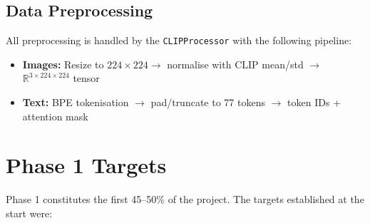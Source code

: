 \documentclass[12pt,a4paper]{article}
\begin{document}
\subsection{Data Preprocessing}

All preprocessing is handled by the \texttt{CLIPProcessor} with the following pipeline:

\begin{itemize}
  \item \textbf{Images:} Resize to $224 \times 224 \rightarrow$ normalise with CLIP mean/std $\rightarrow$ $\mathbb{R}^{3 \times 224 \times 224}$ tensor
  \item \textbf{Text:} BPE tokenisation $\rightarrow$ pad/truncate to 77 tokens $\rightarrow$ token IDs + attention mask
\end{itemize}

\section{Phase 1 Targets}

Phase 1 constitutes the first 45--50\% of the project. The targets established at the start were:
\end{document}
